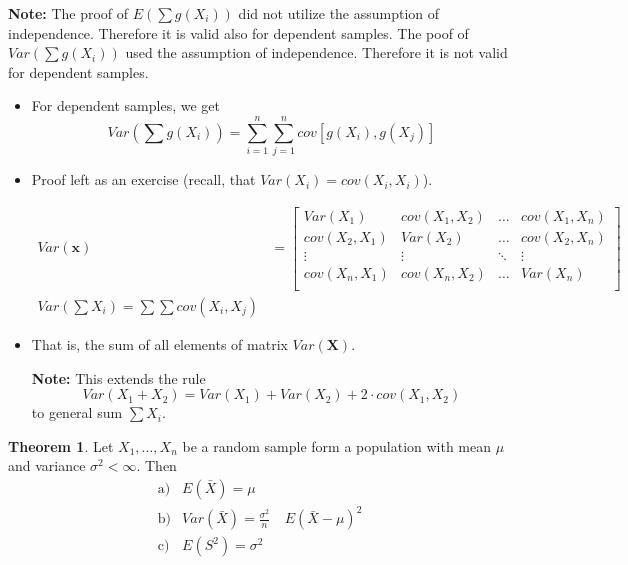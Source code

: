 \documentclass[10pt, twoside, a4paper]{book}
\theoremstyle{definition}
\newtheorem{theorem}{Theorem}[chapter]
\begin{document}
\textbf{Note:} The proof of $E(\sum g(X_i))$ did not utilize the assumption of
independence. Therefore it is valid also for dependent samples. The poof of
$Var(\sum g(X_i))$ used the assumption of independence. Therefore it is not
valid for dependent samples.
\begin{itemize}
  \item For dependent samples, we get
  $$Var(\sum g(X_i))= \sum_{i=1}^n \sum_{j=1}^n cov\left[g(X_i),g(X_j)\right]$$
  \item Proof left as an exercise (recall, that $Var(X_i) = cov(X_i, X_i)$).

\begin{equation*}
\renewcommand{\arraystretch}{1.6}
\begin{array}{ll}

Var(\bm x) & = 
\begin{bmatrix}
Var(X_1) & cov(X_1, X_2)  & \hdots & cov(X_1, X_n) \\
cov(X_2, X_1) & Var(X_2)  & \hdots & cov(X_2, X_n) \\
\vdots & \vdots & \ddots  & \vdots \\
cov(X_n, X_1) & cov(X_n, X_2) & \hdots & Var(X_n) \\
\end{bmatrix} \\
Var(\sum X_i) = \sum\sum cov(X_i, X_j)
\end{array}
\end{equation*}

\item That is, the sum of all elements of matrix $Var(\bm X)$.
\item[\textbf{Note:}] This extends the rule
$$Var(X_1 + X_2) = Var(X_1)+Var(X_2)+2\cdot cov(X_1, X_2)$$
to general sum $\sum X_i$.
\end{itemize}
\begin{theorem}
\label{theoremUnbiasedEstimators1}
Let $X_1,\ldots,X_n$ be a random sample form a population with mean $\mu$ and
variance $\sigma^2 < \infty$. Then
\begin{equation*}
\renewcommand{\arraystretch}{1.6}
\begin{array}{lll}
\text{a)} & E(\bar X) = \mu \\
\text{b)} & Var(\bar X) = \frac{\sigma^2}{n} & ~E(\bar X - \mu)^2 \\ 
\text{c)} & E(S^2) = \sigma^2 \\ 
\end{array}
\end{equation*}
\end{theorem}
\end{document}
